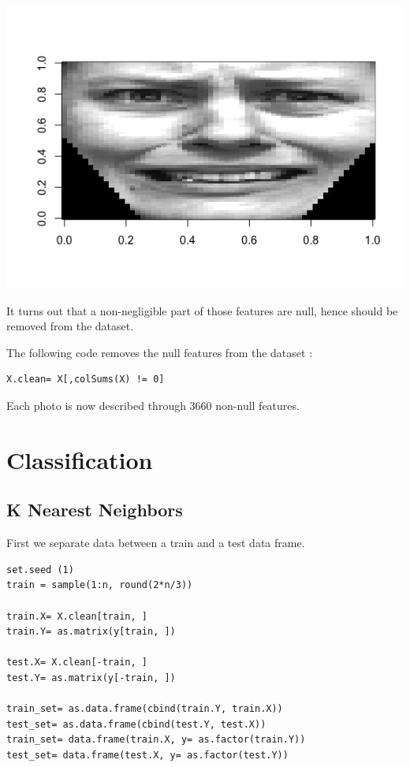 \documentclass[]{report}
\begin{document}
\begin{center}
	\includegraphics[width=0.8\linewidth]{Figures/sad_X204_y6.png}
	\label{fig:y=6}
\end{center}

 It turns out that a non-negligible part of those features are null, hence should be removed from the dataset.

The following code removes the null features from the dataset :
\begin{lstlisting}
X.clean= X[,colSums(X) != 0]
\end{lstlisting}
Each photo is now described through 3660 non-null features.
\pagebreak

\section{Classification}

\subsection{K Nearest Neighbors}
First we separate data between a train and a test data frame.

\begin{lstlisting}
set.seed (1)
train = sample(1:n, round(2*n/3))

train.X= X.clean[train, ]
train.Y= as.matrix(y[train, ])

test.X= X.clean[-train, ]
test.Y= as.matrix(y[-train, ])

train_set= as.data.frame(cbind(train.Y, train.X))
test_set= as.data.frame(cbind(test.Y, test.X))
train_set= data.frame(train.X, y= as.factor(train.Y))
test_set= data.frame(test.X, y= as.factor(test.Y))
\end{lstlisting}
\end{document}
